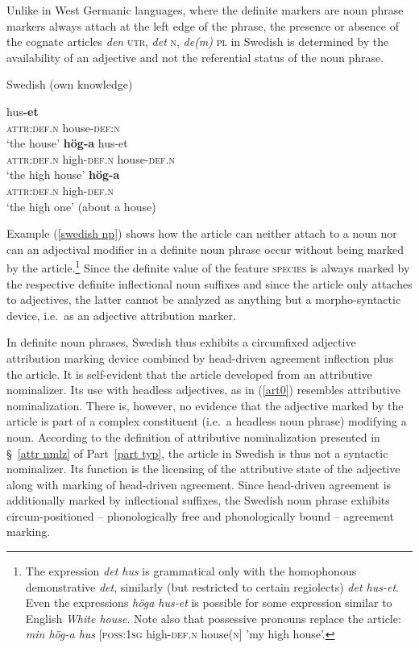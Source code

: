 Unlike in West Germanic languages, where the definite markers are noun phrase markers always attach at the left edge of the phrase, the presence or absence of the cognate articles \textit{den} \textsc{utr}, \textit{det} \textsc{n}, \textit{de(m)} \textsc{pl} in Swedish is determined by the availability of an adjective and not the referential status of the noun phrase. 
\begin{exe}
\label{swedish np}
\ex \rm{Swedish (own knowledge)}
\begin{xlist}
\ex
{} hus\textbf{-et}\\
	\textsc{attr:def.n} house-\textsc{def:n}\\
\glt	‘the house’
\ex	
{} \textbf{hög-a} hus-et\\
	\textsc{attr:def.n} high-\textsc{def.n} house-\textsc{def.n}\\
\glt	‘the high house’
\label{art0}
\ex 
{} \textbf{hög-a}\\
	\textsc{attr:def.n} high-\textsc{def.n}\\
\glt	‘the high one’ (about a house)
\end{xlist}
\end{exe}
Example (\ref{swedish np}) shows how the article can neither attach to a noun nor can an adjectival modifier in a definite noun phrase occur without being marked by the article.\footnote{The expression \textit{det hus} is grammatical only with the homophonous demonstrative \textit{det}, similarly (but restricted to certain regiolects) \textit{det hus-et}. Even the expressions \textit{höga hus-et} is possible for some expression similar to English \textit{White house}. Note also that possessive pronouns replace the article: \textit{min hög-a hus} [\textsc{poss:1sg} high-\textsc{def.n} house(\textsc{n}] 'my high house’.} Since the definite value of the feature \textsc{species} is always marked by the respective definite inflectional noun suffixes %
 and since the article only attaches to adjectives, the latter cannot be analyzed as anything but a morpho-syntactic device, i.e.~as an adjective attribution marker.

In definite noun phrases, Swedish thus exhibits a circumfixed adjective attribution marking device combined by head-driven agreement inflection plus the article. It is self-evident that the article developed from an attributive nominalizer. Its use with headless adjectives, as in (\ref{art0}) resembles attributive nominalization. There is, however, no evidence that the adjective marked by the article is part of a complex constituent (i.e.~a headless noun phrase) modifying a noun. According to the definition of attributive nominalization presented in \S~\ref{attr nmlz} of Part~\ref{part typ}, the article in Swedish is thus not a syntactic nominalizer. Its function is the licensing of the attributive state of the adjective along with marking of head-driven agreement. Since head-driven agreement is additionally marked by inflectional suffixes, the Swedish noun phrase exhibits circum-positioned – phonologically free and phonologically bound – agreement marking.

